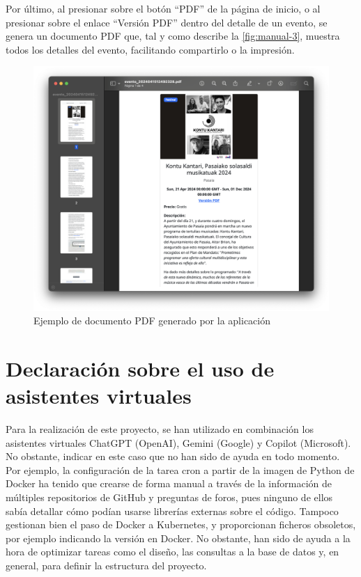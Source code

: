 \documentclass{report}
\begin{document}
        Por último, al presionar sobre el botón “PDF” de la página de inicio, o al presionar sobre el enlace “Versión PDF” dentro del detalle de un evento, se genera un documento PDF que, tal y como describe la \autoref{fig:manual-3}, muestra todos los detalles del evento, facilitando compartirlo o la impresión.

        \begin{figure}[H]
            \centering
            \includegraphics[width=0.65\linewidth]{img/manual-3.png}
            \caption{Ejemplo de documento PDF generado por la aplicación}
            \label{fig:manual-3}
        \end{figure}

    \chapter{Declaración sobre el uso de asistentes virtuales}

        Para la realización de este proyecto, se han utilizado en combinación los asistentes virtuales ChatGPT (OpenAI), Gemini (Google) y Copilot (Microsoft). No obstante, indicar en este caso que no han sido de ayuda en todo momento. Por ejemplo, la configuración de la tarea cron a partir de la imagen de Python de Docker ha tenido que crearse de forma manual a través de la información de múltiples repositorios de GitHub y preguntas de foros, pues ninguno de ellos sabía detallar cómo podían usarse librerías externas sobre el código. Tampoco gestionan bien el paso de Docker a Kubernetes, y proporcionan ficheros obsoletos, por ejemplo indicando la versión en Docker. No obstante, han sido de ayuda a la hora de optimizar tareas como el diseño, las consultas a la base de datos y, en general, para definir la estructura del proyecto.

    \clearpage
\end{document}

